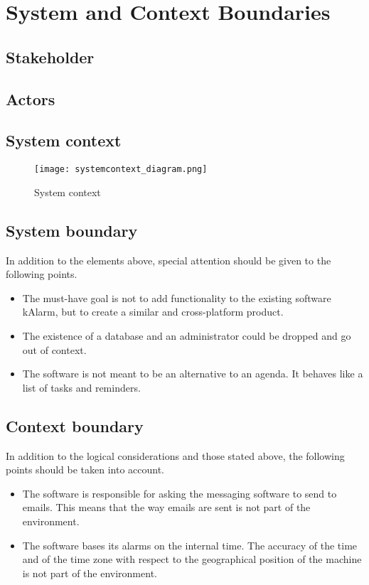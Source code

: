 \chapter{System and Context Boundaries}\label{ch:sys_ctx_boundaries}

\section{Stakeholder}


\section{Actors}


\newpage
\section{System context}
\begin{figure}[h]
	\centering
	\caption{System context}
	\texttt{[image: systemcontext\_diagram.png]}
\end{figure}

\section{System boundary}
In addition to the elements above, special attention should be given to the following points.
\begin{itemize}
	\item The must-have goal is not to add functionality to the existing software kAlarm, but to create a similar and cross-platform product.
	\item The existence of a database and an administrator could be dropped and go out of context.
	\item The software is not meant to be an alternative to an agenda. It behaves like a list of tasks and reminders.
\end{itemize}

\section{Context boundary}
In addition to the logical considerations and those stated above, the following points should be taken into account.
\begin{itemize}
	\item The software is responsible for asking the messaging software to send
        to emails. This means that the way emails are sent is not part of the environment.
	\item The software bases its alarms on the internal time. The accuracy of the time and of the time zone with respect to the geographical position of the machine is not part of the environment.
\end{itemize}
